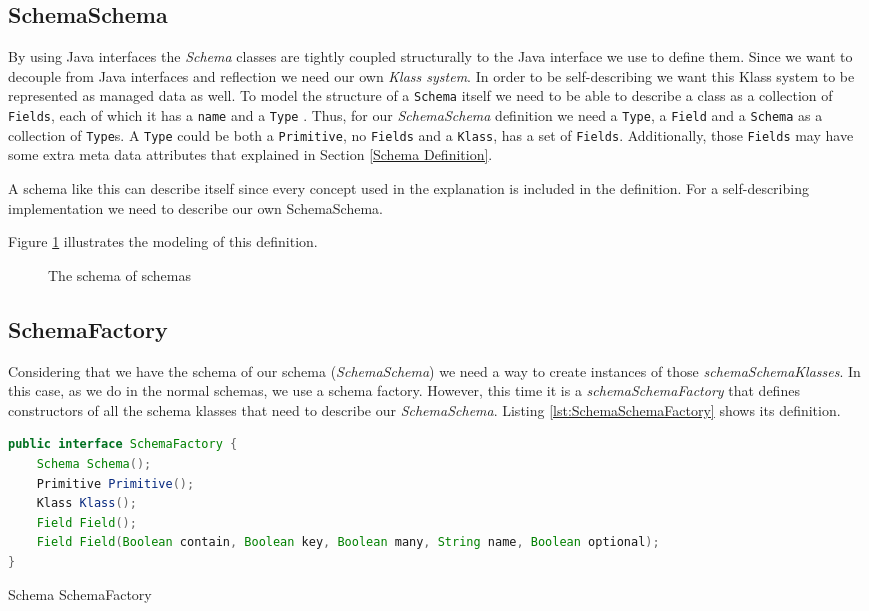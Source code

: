 \subsection{SchemaSchema}\label{sec:SchemaSchema}
By using Java interfaces the \textit{Schema} classes are tightly coupled structurally to the Java interface we use to define them.
Since we want to decouple from Java interfaces and reflection we need our own \textit{Klass system}.
In order to be self-describing we want this Klass system to be represented as managed data as well. 
To model the structure of a \texttt{Schema} itself we need to be able to describe a class as a collection of \texttt{Fields}, each of which it has a \texttt{name} and a \texttt{Type} \cite{loh2012managed}. 
Thus, for our \textit{SchemaSchema} definition we need a \texttt{Type}, a \texttt{Field} and a \texttt{Schema} as a collection of \texttt{Type}s. 
A \texttt{Type} could be both a \texttt{Primitive}, no \texttt{Fields} and a \texttt{Klass}, has a set of \texttt{Fields}.
Additionally, those \texttt{Fields} may have some extra meta data attributes that explained in Section \ref{Schema Definition}.

A schema like this can describe itself since every concept used in the explanation is included in the definition.
For a self-describing implementation we need to describe our own SchemaSchema. 

Figure \ref{fig:SchemaSchema_definition} illustrates the modeling of this definition.

\begin{figure}[H]
	\centering
  	\caption{The schema of schemas}
  	\label{fig:SchemaSchema_definition}
\end{figure}

\subsection{SchemaFactory}\label{sec:SchemaFactory}
Considering that we have the schema of our schema (\textit{SchemaSchema}) we need a way to create instances of those \textit{schemaSchemaKlasses}.
In this case, as we do in the normal schemas, we use a schema factory. 
However, this time it is a \textit{schemaSchemaFactory} that defines constructors of all the schema klasses that need to describe our \textit{SchemaSchema}.
Listing \ref{lst:SchemaSchemaFactory} shows its definition.

\begin{sourcecode} [H]
	\begin{lstlisting}[language=Java, escapechar=|]
public interface SchemaFactory {
    Schema Schema();
    Primitive Primitive();
    Klass Klass();
    Field Field();
    Field Field(Boolean contain, Boolean key, Boolean many, String name, Boolean optional);
}
	\end{lstlisting}
	\caption{Schema SchemaFactory}
	\label{lst:SchemaSchemaFactory}
\end{sourcecode}

